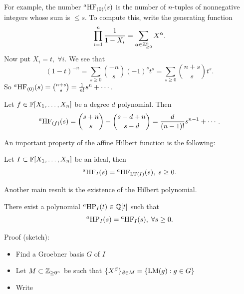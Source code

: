 \begin{itemize}
    \begin{example}
        For example, the number $\prescript{a}{}{}\text{HF}_{(0)}(s)$ is the number of $n$-tuples of 
        nonnegative integers whose sum is $\leq s$. To compute this, write the generating function
        \begin{equation}
            \prod_{i=1}^n\frac{1}{1-X_i} = \sum_{\alpha\in\mathbb{Z}_{\geq0}^n}X^\alpha.
        \end{equation}
        Now put $X_i = t,\;\forall i$. We see that 
        \begin{equation}
            (1-t)^{-n} = \sum_{s\geq0}\binom{-n}{s}(-1)^st^s = \sum_{s\geq0}\binom{n+s}{s}t^s.
        \end{equation}
        So $\prescript{a}{}{}\text{HF}_{(0)}(s)=\binom{n+s}{s}=\frac{1}{n!}s^n + \cdots$.
    \end{example}
    \begin{example}
        Let $f\in\mathbb{F}[X_1,\dots, X_n]$ be a degree $d$ polynomial. Then 
        \begin{equation}
            \prescript{a}{}{}\text{HF}_{(f)}(s) = \binom{s+n}{s} - \binom{s-d+n}{s-d} = \frac{d}{(n-1)!}s^{n-1}+\cdots.
        \end{equation} 
    \end{example}
    An important property of the affine Hilbert function is the following:
\begin{theorem}
    Let $I\subset \mathbb{F}[X_1,\dots, X_n]$ be an ideal, then 
    \begin{equation}
        \prescript{a}{}{}\text{HF}_I(s)  = \prescript{a}{}{}\text{HF}_{\text{LT}(I)}(s),\;s\geq0.
    \end{equation}
\end{theorem}
Another main result is the existence of the Hilbert polynomial.
\begin{theorem}
    There exist a polynomial $\prescript{a}{}{}\text{HP}_I(t)\in\mathbb{Q}[t]$ such that 
    \begin{equation}
        \prescript{a}{}{}\text{HP}_I(s) =   \prescript{a}{}{}\text{HF}_I(s),\;\forall s\geq0.
    \end{equation}
\end{theorem}
Proof (sketch):
\begin{itemize}
    \item Find a Groebner basis $G$ of $I$
    \item Let $M\subset \mathbb{Z}_{\geq0^n}$ be such that $\{X^\beta\}_{\beta\in M} = \{\text{LM}(g):g\in G\}$
    \item Write 
    \begin{equation}

\end{equation}
\end{itemize}
\end{itemize}
